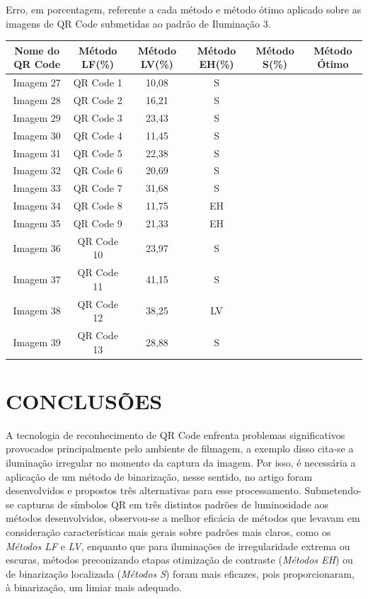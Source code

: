 \documentclass{ceel}
\begin{document}
\begin{multicols}{2}
\vspace{0.5cm}
\begin{minipage}[h]{\columnwidth}
\begin{scriptsize}
\def\arraystretch{1.35}
\captionsetup{type=table}
\begin{center}
\caption{Erro, em porcentagem, referente a cada método e método ótimo aplicado sobre as imagens de QR Code submetidas ao padrão de Iluminação 3.} \label{tabP3} \vspace{-0.2cm}
\begin{tabular}{c c c c c c}\hline
\textbf{Nome do QR Code}&\textbf{Método LF(\%)}&\textbf{Método LV(\%)}&\textbf{Método EH(\%)}&\textbf{Método S(\%)}&\textbf{Método Ótimo} \\\hline
Imagem 27 & QR Code 1 & 10,08 & S \\
Imagem 28 & QR Code 2 & 16,21 & S \\
Imagem 29 & QR Code 3 & 23,43 & S \\ 
Imagem 30 & QR Code 4 & 11,45 & S \\
Imagem 31 & QR Code 5 & 22,38 & S \\
Imagem 32 & QR Code 6 & 20,69 & S \\
Imagem 33 & QR Code 7 & 31,68 & S \\
Imagem 34 & QR Code 8 & 11,75 & EH \\
Imagem 35 & QR Code 9 & 21,33 & EH \\
Imagem 36 & QR Code 10 & 23,97 & S \\
Imagem 37 & QR Code 11 & 41,15 & S \\
Imagem 38 & QR Code 12 & 38,25 & LV \\
Imagem 39 & QR Code 13 & 28,88 & S \\\hline
\end{tabular}
\end{center}
\end{scriptsize}
\end{minipage}

\vspace{0.5cm}
\section{CONCLUSÕES}
A tecnologia de reconhecimento de QR Code enfrenta problemas significativos provocados principalmente pelo ambiente de filmagem, a exemplo disso cita-se a iluminação irregular no momento da captura da imagem. Por isso, é necessária a aplicação de um método de binarização, nesse sentido, no artigo foram desenvolvidos e propostos três alternativas para esse processamento. Submetendo-se capturas de símbolos QR em três distintos padrões de luminosidade aos métodos desenvolvidos, observou-se a melhor eficácia de métodos que levavam em consideração características mais gerais sobre padrões mais claros, como os \emph{Métodos LF} e \textit{LV}, enquanto que para iluminações de irregularidade extrema ou escuras, métodos preconizando etapas otimização de contraste (\emph{Métodos EH}) ou de binarização localizada (\emph{Métodos S}) foram mais eficazes, pois proporcionaram, à binarização, um limiar mais adequado.


\end{multicols}
\end{document}
